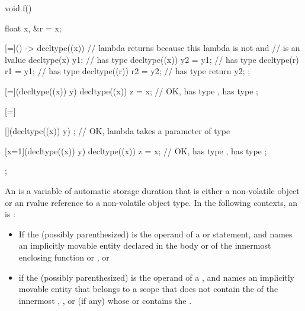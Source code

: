 \begin{example}
\begin{codeblock}
void f() {
  float x, &r = x;

  [=]() -> decltype((x)) {      // lambda returns  because this lambda is not  and
                                //  is an lvalue
    decltype(x) y1;             //  has type 
    decltype((x)) y2 = y1;      //  has type 
    decltype(r) r1 = y1;        //  has type 
    decltype((r)) r2 = y2;      //  has type 
    return y2;
  };

  [=](decltype((x)) y) {
    decltype((x)) z = x;        // OK,  has type ,  has type 
  };

  [=] {
    [](decltype((x)) y) {};     // OK, lambda takes a parameter of type 

    [x=1](decltype((x)) y) {
      decltype((x)) z = x;      // OK,  has type ,  has type 
    };
  };
}
\end{codeblock}
\end{example}

\pnum
An  is
a variable of automatic storage duration
that is either a non-volatile object or
an rvalue reference to a non-volatile object type.
In the following contexts,
an  is :
\begin{itemize}
\item
If the  (possibly parenthesized)
is the operand of a  or
 statement,
and names an implicitly movable entity declared in the body
or  of the innermost enclosing
function or , or
\item
if the  (possibly parenthesized)
is the operand of a ,
and names an implicitly movable entity
that belongs to a scope that does not contain the 
of the innermost
,
, or
 (if any)
whose  or 
contains the .
\end{itemize}

